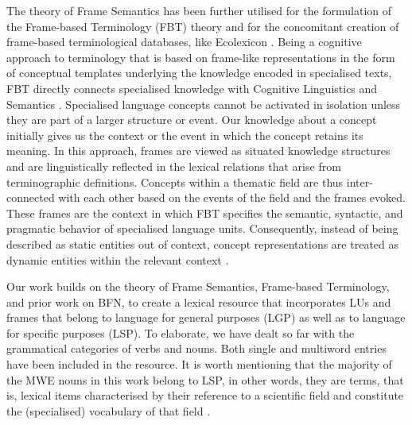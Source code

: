 \documentclass[output=paper,colorlinks,citecolor=brown]{langscibook}
\begin{document}
The theory of Frame Semantics has been further utilised for the formulation of the Frame-based Terminology (FBT) theory \citep{faber_dynamics_2011, faber_2015} and for the concomitant creation of frame-based terminological databases, like Ecolexicon \citep{ELX2014-045}. Being a cognitive approach to terminology that is based on frame-like representations in the form of conceptual templates underlying the knowledge encoded in specialised texts, FBT directly connects specialised knowledge with Cognitive Linguistics and Semantics \citep{faber_2015}. Specialised language concepts cannot be activated in isolation unless they are part of a larger structure or event. Our knowledge about a concept initially gives us the context or the event in which the concept retains its meaning. In this approach, frames are viewed as situated knowledge structures and are linguistically reflected in the lexical relations that arise from terminographic definitions. Concepts within a thematic field are thus inter-connected with each other based on the events of the field and the frames evoked. These frames are the context in which FBT specifies the semantic, syntactic, and pragmatic behavior of specialised language units. Consequently, instead of being described as static entities out of context, concept representations are treated as dynamic entities within the relevant context \citep{faber_dynamics_2011}.

Our work builds on the theory of Frame Semantics, Frame-based Terminology, and prior work on BFN, to create a lexical resource that incorporates LUs and frames that belong to language for general purposes (LGP) as well as to language for specific purposes (LSP). To elaborate, we have dealt so far with the grammatical categories of verbs and nouns. Both single and multiword entries have been included in the resource. It is worth mentioning that the majority of the MWE nouns in this work belong to LSP, in other words, they are terms, that is, lexical items characterised by their reference to a scientific field and constitute the (specialised) vocabulary of that field \citep{Sager1990}.
\end{document}
